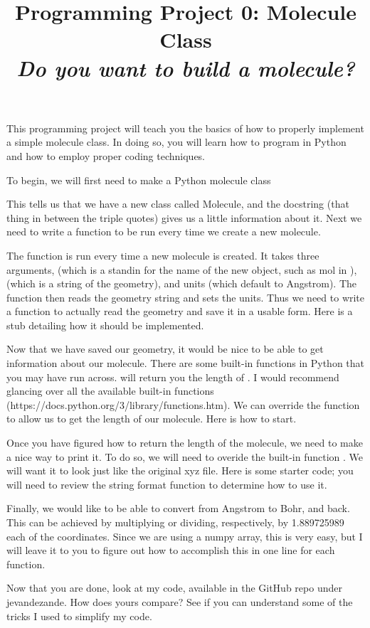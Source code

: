\documentclass[11pt]{article}
\title{Programming Project 0: Molecule Class\\ \textit{Do you want to build a molecule?}}
\date{}
\begin{document}
\maketitle

This programming project will teach you the basics of how to properly implement
a simple molecule class. In doing so, you will learn how to program in Python
and how to employ proper coding techniques.

To begin, we will first need to make a Python molecule class


This tells us that we have a new class called Molecule, and the docstring (that
thing in between the triple quotes) gives us a little information about it. Next
we need to write a function to be run every time we create a new molecule.


The function  is run every time a new molecule is created.
It takes three arguments,  (which is a standin for the name of
the new object, such as mol in ),
 (which is a string of the geometry), and units (which
default to Angstrom). The function then reads the geometry string and sets the
units. Thus we need to write a function to actually read the geometry and save
it in a usable form. Here is a stub detailing how it should be implemented.


Now that we have saved our geometry, it would be nice to be able to get
information about our molecule. There are some built-in functions in Python
that you may have run across.  will return you the
length of . I would recommend glancing over all the
available built-in functions (https://docs.python.org/3/library/functions.htm).
We can override the function  to allow us to get the length
of our molecule. Here is how to start.


Once you have figured how to return the length of the molecule, we need to make
a nice way to print it. To do so, we will need to overide the built-in function
. We will want it to look just like the original xyz file. Here is some
starter code; you will need to review the string format function to determine
how to use it.


Finally, we would like to be able to convert from Angstrom to Bohr, and back.
This can be achieved by multiplying or dividing, respectively, by 1.889725989
each of the coordinates. Since we are using a numpy array, this is very easy,
but I will leave it to you to figure out how to accomplish this in one line
for each function.

Now that you are done, look at my code, available in the GitHub repo under
jevandezande. How does yours compare? See if you can understand some of the
tricks I used to simplify my code.
\end{document}
